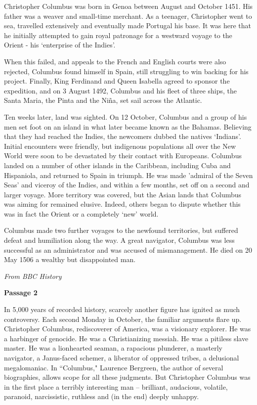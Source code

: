 \bigskip
\begin{linenumbers*}
\modulolinenumbers[5]
\indent Christopher Columbus was born in Genoa between August and October 1451. His father was a weaver and small-time merchant. As a teenager, Christopher went to sea, travelled extensively and eventually made Portugal his base. It was here that he initially attempted to gain royal patronage for a westward voyage to the Orient - his `enterprise of the Indies'.

\indent When this failed, and appeals to the French and English courts were also rejected, Columbus found himself in Spain, still struggling to win backing for his project. Finally, King Ferdinand and Queen Isabella agreed to sponsor the expedition, and on 3 August 1492, Columbus and his fleet of three ships, the Santa Maria, the Pinta and the Niña, set sail across the Atlantic.

\indent Ten weeks later, land was sighted. On 12 October, Columbus and a group of his men set foot on an island in what later became known as the Bahamas. Believing that they had reached the Indies, the newcomers dubbed the natives `Indians'. Initial encounters were friendly, but indigenous populations all over the New World were soon to be devastated by their contact with Europeans. Columbus landed on a number of other islands in the Caribbean, including Cuba and Hispaniola, and returned to Spain in triumph. He was made 'admiral of the Seven Seas' and viceroy of the Indies, and within a few months, set off on a second and larger voyage. More territory was covered, but the Asian lands that Columbus was aiming for remained elusive. Indeed, others began to dispute whether this was in fact the Orient or a completely `new' world.

\indent Columbus made two further voyages to the newfound territories, but suffered defeat and humiliation along the way. A great navigator, Columbus was less successful as an administrator and was accused of mismanagement. He died on 20 May 1506 a wealthy but disappointed man.
\end{linenumbers*}

\textit{From BBC History}

\bigskip
\textbf{Passage 2}

\bigskip
\begin{linenumbers}
\modulolinenumbers[5]
\indent In 5,000 years of recorded history, scarcely another figure has ignited as much controversy. Each second Monday in October, the familiar arguments flare up. Christopher Columbus, rediscoverer of America, was a visionary explorer. He was a harbinger of genocide. He was a Christianizing messiah. He was a pitiless slave master. He was a lionhearted seaman, a rapacious plunderer, a masterly navigator, a Janus-faced schemer, a liberator of oppressed tribes, a delusional megalomaniac. In ``Columbus," Laurence Bergreen, the author of several biographies, allows scope for all these judgments. But Christopher Columbus was in the first place a terribly interesting man -- brilliant, audacious, volatile, paranoid, narcissistic, ruthless and (in the end) deeply unhappy.
\end{linenumbers}

